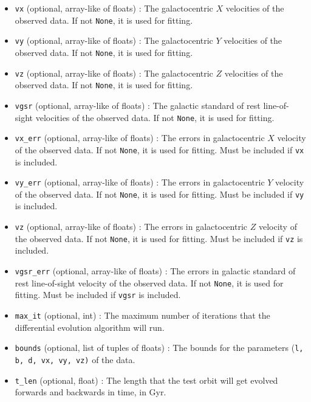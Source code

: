 \documentclass{article}
\begin{document}
\begin{itemize}
\begin{itemize}
\item \verb!vx! (optional, array-like of floats) : The galactocentric $X$ velocities of the observed data. If not \verb!None!, it is used for fitting. 

\item \verb!vy! (optional, array-like of floats) : The galactocentric $Y$ velocities of the observed data. If not \verb!None!, it is used for fitting. 

\item \verb!vz! (optional, array-like of floats) : The galactocentric $Z$ velocities of the observed data. If not \verb!None!, it is used for fitting. 

\item \verb!vgsr! (optional, array-like of floats) : The galactic standard of rest line-of-sight velocities of the observed data. If not \verb!None!, it is used for fitting. 

\item \verb!vx_err! (optional, array-like of floats) : The errors in galactocentric $X$ velocity of the observed data. If not \verb!None!, it is used for fitting. Must be included if \verb!vx! is included. 

\item \verb!vy_err! (optional, array-like of floats) : The errors in galactocentric $Y$ velocity of the observed data. If not \verb!None!, it is used for fitting. Must be included if \verb!vy! is included. 

\item \verb!vz! (optional, array-like of floats) : The errors in galactocentric $Z$ velocity of the observed data. If not \verb!None!, it is used for fitting. Must be included if \verb!vz! is included. 

\item \verb!vgsr_err! (optional, array-like of floats) : The errors in galactic standard of rest line-of-sight velocity of the observed data. If not \verb!None!, it is used for fitting. Must be included if \verb!vgsr! is included.

\item \verb!max_it! (optional, int) : The maximum number of iterations that the differential evolution algorithm will run. 

\item \verb!bounds! (optional, list of tuples of floats) : The bounds for the parameters (\verb!l, b, d, vx, vy, vz)! of the data. 

\item \verb!t_len! (optional, float) : The length that the test orbit will get evolved forwards and backwards in time, in Gyr. 


\end{itemize}
\end{itemize}
\end{document}
